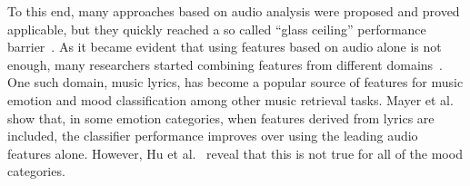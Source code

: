 \documentclass{llncs}
\begin{document}
To this end, many approaches based on audio analysis were proposed and proved applicable, but they quickly reached a so called ``glass ceiling'' performance barrier~\cite{DBLP:journals/taslp/LuLZ06}. As it became evident that using features based on audio alone is not enough, many researchers started combining features from different domains~\cite{DBLP:conf/ismir/KimSMMRSST10}.
One such domain, music lyrics, has become a popular source of features for music emotion and mood classification among other music retrieval tasks. Mayer et al.~\cite{DBLP:conf/mm/MayerNR08} show that, in some emotion categories, when features derived from lyrics are included, the classifier performance improves over using the leading audio features alone. However, Hu et al.~\cite{DBLP:conf/ismir/HuDE09} reveal that this is not true for all of the mood categories. 
\end{document}
